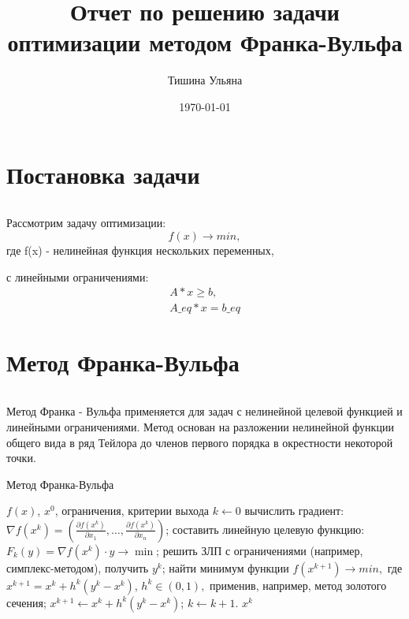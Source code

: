 \documentclass{article}
\title{Отчет по решению задачи оптимизации методом Франка-Вульфа}
\author{Тишина Ульяна}
\date{\today} %
\begin{document}
\maketitle

\renewcommand{\contentsname}{Содержание} %

\newpage
\tableofcontents


\newpage
\section{Постановка задачи}
  $ $
  
Рассмотрим задачу оптимизации:
\begin{equation}
f(x)  \rightarrow min,
\end{equation}
где f(x) - нелинейная функция нескольких переменных,

с линейными ограничениями:
\begin{equation}
\begin{array}{c}
A * x \ge b,\\
A\_eq * x = b\_eq
\end{array}
\end{equation}

\section{Метод Франка-Вульфа}
$ $

Метод Франка - Вульфа применяется для задач с нелинейной целевой функцией и линейными ограничениями. Метод основан на разложении нелинейной функции общего вида в ряд Тейлора до членов первого порядка в окрестности некоторой точки.


\begin{algorithm}
\caption{Метод Франка-Вульфа}
\begin{algorithmic}[1]
\Require $f(x)$, $x^0$, ограничения, критерии выхода
\State $k \gets 0$
    \State вычислить градиент: $\nabla f(x^k) = \left(\frac{\partial f(x^k)}{\partial x_1}, \dots, \frac{\partial f(x^k)}{\partial x_n}\right)$;
    \State составить линейную целевую функцию: $F_k(y) = \nabla f(x^k) \cdot y \rightarrow \min$;
    \State решить ЗЛП с ограничениями (например, симплекс-методом), получить $y^k$;
    \State найти минимум функции $f(x^{k+1}) \rightarrow min,$
где $x^{k+1} = x^k + h^k (y^k - x^k)$, 
$h^k \in (0, 1),$
применив, например, метод золотого сечения;
    \State $x^{k+1} \gets x^k + h^k (y^k - x^k)$;
    \State $k \gets k + 1$.
\EndWhile
\State \Return $x^k$
\end{algorithmic}
\end{algorithm}
\end{document}
